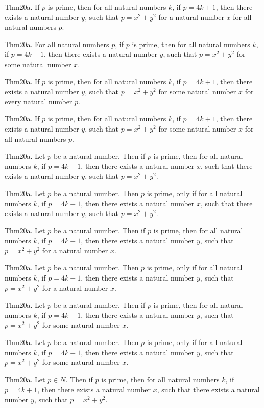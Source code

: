 \documentclass{article}
\begin{document}
Thm20a. If $p$ is prime, then for all natural numbers $k$, if $p = 4 k + 1$, then there exists a natural number $y$, such that $p = x ^{ 2}+ y ^{ 2}$ for a natural number $x$ for all natural numbers $p$.

Thm20a. For all natural numbers $p$, if $p$ is prime, then for all natural numbers $k$, if $p = 4 k + 1$, then there exists a natural number $y$, such that $p = x ^{ 2}+ y ^{ 2}$ for some natural number $x$.

Thm20a. If $p$ is prime, then for all natural numbers $k$, if $p = 4 k + 1$, then there exists a natural number $y$, such that $p = x ^{ 2}+ y ^{ 2}$ for some natural number $x$ for every natural number $p$.

Thm20a. If $p$ is prime, then for all natural numbers $k$, if $p = 4 k + 1$, then there exists a natural number $y$, such that $p = x ^{ 2}+ y ^{ 2}$ for some natural number $x$ for all natural numbers $p$.

Thm20a. Let $p$ be a natural number. Then if $p$ is prime, then for all natural numbers $k$, if $p = 4 k + 1$, then there exists a natural number $x$, such that there exists a natural number $y$, such that $p = x ^{ 2}+ y ^{ 2}$.

Thm20a. Let $p$ be a natural number. Then $p$ is prime, only if for all natural numbers $k$, if $p = 4 k + 1$, then there exists a natural number $x$, such that there exists a natural number $y$, such that $p = x ^{ 2}+ y ^{ 2}$.

Thm20a. Let $p$ be a natural number. Then if $p$ is prime, then for all natural numbers $k$, if $p = 4 k + 1$, then there exists a natural number $y$, such that $p = x ^{ 2}+ y ^{ 2}$ for a natural number $x$.

Thm20a. Let $p$ be a natural number. Then $p$ is prime, only if for all natural numbers $k$, if $p = 4 k + 1$, then there exists a natural number $y$, such that $p = x ^{ 2}+ y ^{ 2}$ for a natural number $x$.

Thm20a. Let $p$ be a natural number. Then if $p$ is prime, then for all natural numbers $k$, if $p = 4 k + 1$, then there exists a natural number $y$, such that $p = x ^{ 2}+ y ^{ 2}$ for some natural number $x$.

Thm20a. Let $p$ be a natural number. Then $p$ is prime, only if for all natural numbers $k$, if $p = 4 k + 1$, then there exists a natural number $y$, such that $p = x ^{ 2}+ y ^{ 2}$ for some natural number $x$.

Thm20a. Let $p \in N$. Then if $p$ is prime, then for all natural numbers $k$, if $p = 4 k + 1$, then there exists a natural number $x$, such that there exists a natural number $y$, such that $p = x ^{ 2}+ y ^{ 2}$.
\end{document}
